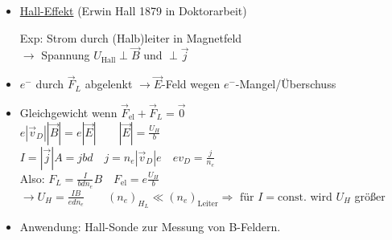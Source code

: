 \documentclass[titlepage,12pt,a4paper,ngerman]{report}
\newcommand{\tx}[1]{\textrm{#1}}
\begin{document}
\begin{itemize}
	\item \underline{Hall-Effekt} (Erwin Hall 1879 in Doktorarbeit)
	\item[Exp:] Strom durch (Halb)leiter in Magnetfeld\\
	$ \rightarrow $ Spannung $ U_{\tx{Hall}} \perp \vec{B} $ und $ \perp \vec{j} $
	\item $ e^- $ durch $ \vec{F}_L $ abgelenkt $ \rightarrow \vec{E} $-Feld wegen $ e^- $-Mangel/Überschuss
	\item Gleichgewicht wenn $ \vec{F}_{\tx{el}} + \vec{F}_L = \vec{0} $\\
	$ e | \vec{v}_D | | \vec{B} | = e | \vec{E}| \qquad | \vec{E} | = \frac{U_H}{b} $\\
	$ I = |\vec{j}| A = j b d   \quad j = n_e |\vec{v}_D| e \quad e v_D = \frac{j}{n_e}$\\
	Also: $ F_L = \frac{I}{b d n_e} B \quad F_{\tx{el}} = e \frac{U_H}{b} $\\
	$ \rightarrow \boxed{U_H = \frac{IB}{e d n_e}} \qquad (n_e)_{H_L} \ll (n_e)_{\tx{Leiter}} \Rightarrow \tx{ für } I = \tx{const.}  $ wird $ U_H $ größer
	\item Anwendung: Hall-Sonde zur Messung von B-Feldern.
\end{itemize}
\end{document}

